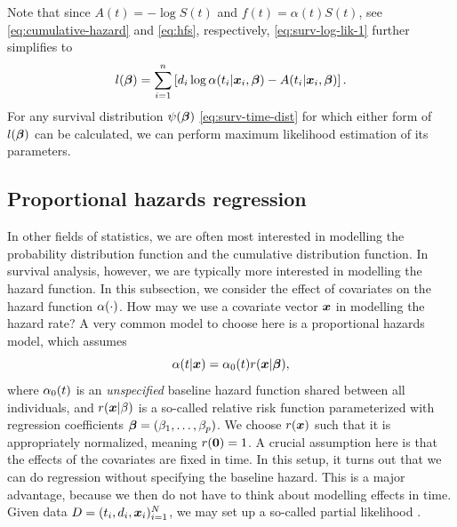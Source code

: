 Note that since $A(t)=-\log S(t)$ and $f(t)=\alpha(t)S(t)$, see \eqref{eq:cumulative-hazard} and \eqref{eq:hfs}, respectively, \eqref{eq:surv-log-lik-1} further simplifies to
\begin{equation*}%
    l(\bbeta)=\sum_{i=1}^n\left[ d_i \log \hz(t_i|\x_i,\bbeta) - A(t_i|\x_i,\bbeta)\right].
\end{equation*}
For any survival distribution $\psi(\boldsymbol{\beta})$ \eqref{eq:surv-time-dist} for which either form of $l(\boldsymbol{\beta})$ can be calculated, we can perform maximum likelihood estimation of its parameters.

\subsection{Proportional hazards regression}\label{subsec:ph-reg}
In other fields of statistics, we are often most interested in modelling the probability distribution function and the cumulative distribution function.
In survival analysis, however, we are typically more interested in modelling the hazard function.
In this subsection, we consider the effect of covariates on the hazard function $\alpha(\cdot)$.
How may we use a covariate vector $\bm{x}$ in modelling the hazard rate?
A very common model to choose here is a proportional hazards model, which assumes
\begin{equation}\label{eq:PH}
    \alpha(t|\bm{x})=\alpha_0(t)r(\bm{x}|\boldsymbol{\beta}),
\end{equation}
where $\alpha_0(t)$ is an \textit{unspecified} baseline hazard function shared between all individuals, and $r(\bm{x}|\beta)$ is a so-called relative risk function parameterized with regression coefficients $\boldsymbol{\beta}=(\beta_1,\ldots,\beta_p)$. We choose $r(\bm{x})$ such that it is appropriately normalized, meaning $r(\bm{0})=1$.
A crucial assumption here is that the effects of the covariates are fixed in time. In this setup, it turns out that we can do regression without specifying the baseline hazard. This is a major advantage, because we then do not have to think about modelling effects in time. Given data $D=(t_i,d_i,\bm{x}_i)_{i=1}^N$, we may set up a so-called partial likelihood \citep{cox-model}.

